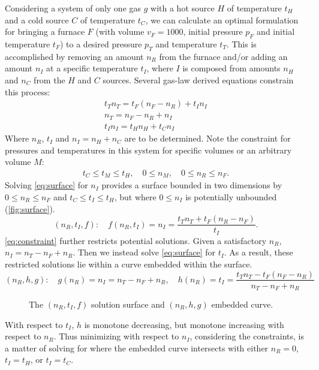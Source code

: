 \documentclass{article}
\begin{document}
Considering a system of only one gas $g$ with
a hot source $H$ of temperature $t_H$ and
a cold source $C$ of temperature $t_C$,
we can calculate an optimal formulation for bringing a furnace $F$
(with volume $v_F=1000$, initial pressure $p_F$ and initial temperature $t_F$)
to a desired pressure $p_T$ and temperature $t_T$.
This is accomplished by removing an amount $n_R$ from the furnace and/or adding
an amount $n_I$ at a specific temperature $t_I$, where $I$ is composed from
amounts $n_H$ and $n_C$ from the $H$ and $C$ sources.
Several gas-law derived equations constrain this process:
\begin{gather}
    t_T n_T = t_F(n_F-n_R)+t_I n_I \label{eq:surface} \\
    n_T = n_F-n_R+n_I \label{eq:constraint} \\
    t_I n_I = t_H n_H+t_C n_I \label{eq:added}
\end{gather}
Where $n_R$, $t_I$ and $n_I=n_H+n_C$ are to be determined.
Note the constraint for pressures and temperatures in this system
for specific volumes or an arbitrary volume $M$:
\begin{gather*}
    t_C\le t_M\le t_H,\quad
    0\le n_M,\quad
    0\le n_R\le n_F.
\end{gather*}
Solving \autoref{eq:surface} for $n_I$ provides a surface bounded in two dimensions
by $0\le n_R\le n_F$ and $t_C\le t_I\le t_H$, but where $0\le n_I$ is potentially unbounded
(\autoref{fig:surface}).
\[
    (n_R,t_I,f):\quad
    f(n_R,t_I) = n_I = \frac{t_T n_T+t_F(n_R-n_F)}{t_I}.
\]
\autoref{eq:constraint} further restricts potential solutions.
Given a satisfactory $n_R$, $n_I=n_T-n_F+n_R$.
Then we instead solve \autoref{eq:surface} for $t_I$.
As a result, these restricted solutions lie within a curve embedded within the surface.
\[
    (n_R,h,g):\quad
    g(n_R) = n_I = n_T-n_F+n_R,\quad
    h(n_R) = t_I = \frac{t_T n_T-t_F(n_F-n_R)}{n_T-n_F+n_R}
\]
\begin{figure}
    \begin{center}
    \end{center}
    \caption[]{%
        The $(n_R,t_I,f)$ solution surface
        and $(n_R,h,g)$ embedded curve.
    }
    \label{fig:surface}
\end{figure}
With respect to $t_I$, $h$ is monotone decreasing, but monotone increasing with respect to $n_R$.
Thus minimizing with respect to $n_I$, considering the constraints, is a matter of solving for where the embedded
curve intersects with either $n_R=0$, $t_I=t_H$, or $t_I=t_C$.
\end{document}
